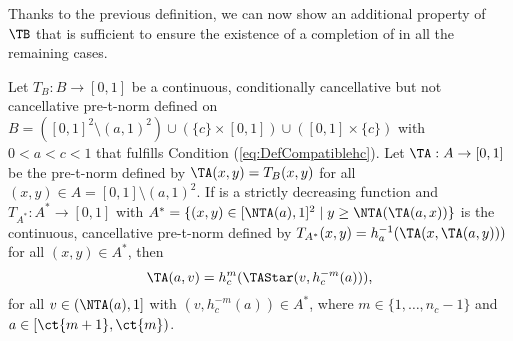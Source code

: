 Thanks to the previous definition, we can now show an additional property of $\TB$ that is sufficient to ensure the existence of a completion of \TB in all the remaining cases.

\begin{lemma}\label{lem:AssociativitywithTAStar}
	Let $T_B : B \to [0,1]$ be a continuous, conditionally cancellative but not cancellative pre-t-norm defined on $B=([0,1]^2 \setminus (a,1)^2) \cup (\{c\} \times [0,1]) \cup ([0,1] \times \{c\})$ with $0<a<c<1$ that fulfills Condition (\ref{eq:DefCompatiblehc}). Let $\TA : A \to [0,1]$ be the pre-t-norm defined by $\TA(x,y)=T_B(x,y)$ for all $(x,y) \in A =[0,1] \setminus (a,1)^2$. If \NTA is a strictly decreasing function and  $T_{A^*}:A^* \to [0,1]$ with $A^* = \{(x,y) \in [\NTA(a),1]^2 \mid y \geq \NTA(\TA(a,x))\}$ is the continuous, cancellative pre-t-norm defined by $T_{A^*}(x,y)=h_a^{-1}(\TA(x,\TA(a,y)))$ for all $(x,y) \in A^*$, then
	$$\TA(a,v) = h_c^m(\TAStar(v,h_c^{-m}(a))),$$
	for all $v\in (\NTA(a),1]$ with $(v,h_c^{-m}(a)) \in A^*$, where  $m \in \{1,\dots,n_c-1\}$ and $a \in [\ct{m+1},\ct{m})$.
\end{lemma}

